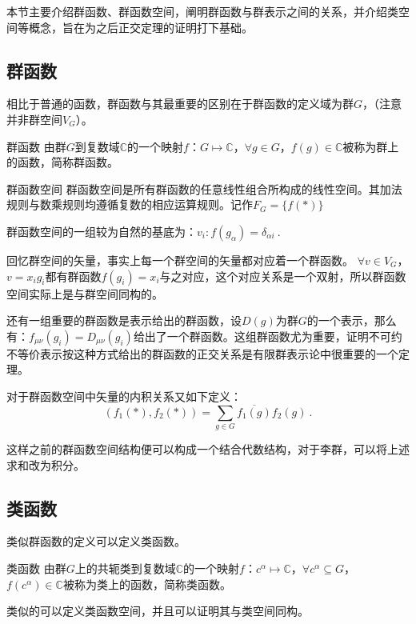 

本节主要介绍群函数、群函数空间，阐明群函数与群表示之间的关系，并介绍类空间等概念，旨在为之后正交定理的证明打下基础。

\subsection{群函数}

相比于普通的函数，群函数与其最重要的区别在于群函数的定义域为群$G$，（注意并非群空间$V_G$）。
\begin{definition}{群函数}
由群$G$到复数域$\mathbb{C}$的一个映射$f$：$G\longmapsto \mathbb{C}$，$\forall g\in G$，$f(g)\in \mathbb{C}$被称为群上的函数，简称群函数。
\end{definition}

\begin{definition}{群函数空间}
群函数空间是所有群函数的任意线性组合所构成的线性空间。其加法规则与数乘规则均遵循复数的相应运算规则。记作$F_G=\{f(*)\}$
\end{definition}

群函数空间的一组较为自然的基底为：$v_i:f(g_\alpha)=\delta_{\alpha i}~.$

回忆群空间的矢量，事实上每一个群空间的矢量都对应着一个群函数。
$\forall v\in V_G$，$v=x_ig_i$都有群函数$f(g_i)=x_i$与之对应，这个对应关系是一个双射，所以群函数空间实际上是与群空间同构的。

还有一组重要的群函数是表示给出的群函数，设$D(g)$为群$G$的一个表示，那么有：$f_{\mu\nu}(g_i)=D_{\mu\nu}(g_i)$给出了一个群函数。这组群函数尤为重要，证明不可约不等价表示按这种方式给出的群函数的正交关系是有限群表示论中很重要的一个定理。

对于群函数空间中矢量的内积关系又如下定义：
$$(f_1(*),f_2(*))=\displaystyle\sum_{g\in G} \overline{f_1(g)}f_2(g)~.$$

这样之前的群函数空间结构便可以构成一个结合代数结构，对于李群，可以将上述求和改为积分。

\subsection{类函数}

类似群函数的定义可以定义类函数。

\begin{definition}{类函数}
由群$G$上的共轭类到复数域$\mathbb{C}$的一个映射$f$：$c^\alpha\longmapsto \mathbb{C}$，$\forall c^\alpha\subseteq G$，$f(c^\alpha)\in \mathbb{C}$被称为类上的函数，简称类函数。
\end{definition}

类似的可以定义类函数空间，并且可以证明其与类空间同构。
